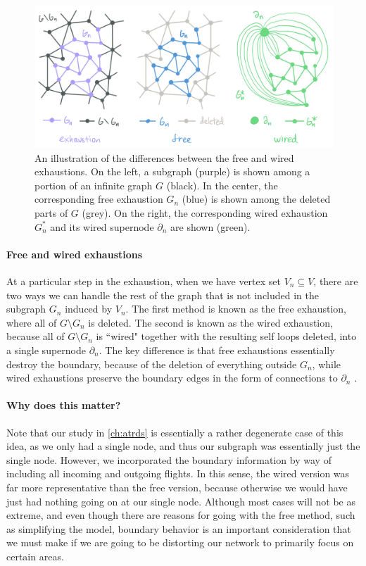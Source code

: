 \begin{figure}[htb!]
    \centering
    \includegraphics[width=.9\linewidth]{media/exhaustions.png}
    \caption{An illustration of the differences between the free and wired exhaustions. On the left, a subgraph (purple) is shown among a portion of an infinite graph $G$ (black). In the center, the corresponding free exhaustion $G_n$ (blue) is shown among the deleted parts of $G$ (grey). On the right, the corresponding wired exhaustion $G_n^*$ and its wired supernode $\partial_n$ are shown (green).}
    \label{fig:exhaustions}
\end{figure}

\paragraph{Free and wired exhaustions} At a particular step in the exhaustion, when we have vertex set $V_n\subseteq V$, there are two ways we can handle the rest of the graph that is not included in the subgraph $G_n$ induced by $V_n$. The first method is known as the free exhaustion, where all of $G\setminus G_n$ is deleted. The second is known as the wired exhaustion, because all of $G\setminus G_n$ is ``wired" together with the resulting self loops deleted, into a single supernode $\partial_n$. The key difference is that free exhaustions essentially destroy the boundary, because of the deletion of everything outside $G_n$, while wired exhaustions preserve the boundary edges in the form of connections to $\partial_n$ \cite{Benjamini_Lyons_Peres_Schramm_2001}.

\paragraph{Why does this matter?} Note that our study in \cref{ch:atrds} is essentially a rather degenerate case of this idea, as we only had a single node, and thus our subgraph was essentially just the single node. However, we incorporated the boundary information by way of including all incoming and outgoing flights. In this sense, the wired version was far more representative than the free version, because otherwise we would have just had nothing going on at our single node. Although most cases will not be as extreme, and even though there are reasons for going with the free method, such as simplifying the model, boundary behavior is an important consideration that we must make if we are going to be distorting our network to primarily focus on certain areas.

